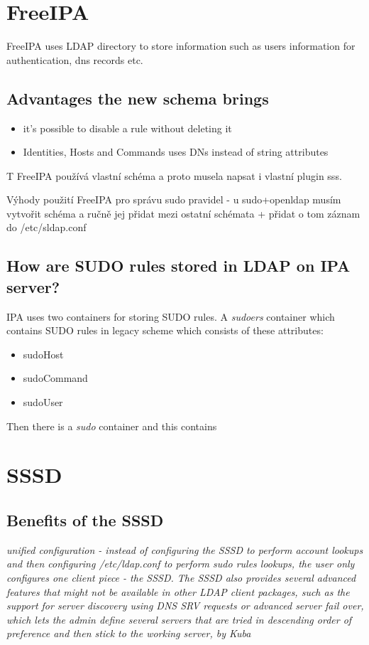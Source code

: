 \documentclass[12pt,a4paper,titlepage,final]{article}
\begin{document}
\section{FreeIPA}
FreeIPA uses LDAP directory to store information such as users information for
authentication, dns records etc.

\subsection{Advantages the new schema brings}
\begin{itemize}
	\item it's possible to disable a rule without deleting it
	\item Identities, Hosts and Commands uses DNs instead of string attributes
\end{itemize}
T
FreeIPA používá vlastní schéma a proto musela napsat i vlastní plugin sss.

Výhody použití FreeIPA pro správu sudo pravidel - u sudo+openldap musím vytvořit
schéma a ručně jej přidat mezi ostatní schémata + přidat o tom záznam do
/etc/sldap.conf

\subsection{How are SUDO rules stored in LDAP on IPA server?}
IPA uses two containers for storing SUDO rules. A \emph{sudoers} container
which contains SUDO rules in legacy scheme which consists of these attributes:
\begin{itemize}
	\item sudoHost
	\item sudoCommand
	\item sudoUser
\end{itemize}
Then there is a \emph{sudo} container and this contains 

\section{SSSD}
\subsection{Benefits of the SSSD}
\textit{unified configuration - instead of configuring the SSSD to perform account
lookups and then configuring /etc/ldap.conf to perform sudo rules lookups, the
user only configures one client piece - the SSSD. The SSSD also provides several
advanced features that might not be available in other LDAP client packages,
such as the support for server discovery using DNS SRV requests or advanced
server fail over, which lets the admin define several servers that are tried in
descending order of preference and then stick to the working server, by Kuba}
\end{document}
